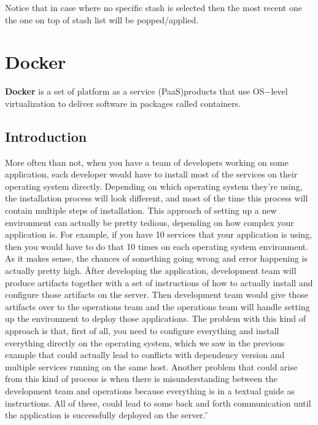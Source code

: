 Notice that in case where no specific stash is selected then the most recent one the one on top of stash list will be
popped/applied.

\newpage

\section{Docker}\label{sec:docker}


\bd[Docker]
\textbf{Docker} is a set of platform as a service (PaaS)\footnotemark products that use OS$-$level virtualization to
deliver software in packages called containers.
\ed


\subsection{Introduction}

More often than not, when you have a team of developers working on some application, each developer would have to
install most of the services on their operating system directly. Depending on which operating system they're using,
the installation process will look different, and most of the time this process will contain multiple steps of
installation. This approach of setting up a new environment can actually be pretty tedious, depending on how complex
your application is. For example, if you have 10 services that your application is using, then you would have to do
that 10 times on each operating system environment. As it makes sense, the chances of something going wrong and error
happening is actually pretty high. \v

After developing the application, development team will produce artifacts together with a set of instructions of how
to actually install and configure those artifacts on the server. Then development team would give those artifacts
over to the operations team and the operations team will handle setting up the environment to deploy those
applications. The problem with this kind of approach is that, first of all, you need to configure everything and
install everything directly on the operating system, which we saw in the previous example that could actually lead to
conflicts with dependency version and multiple services running on the same host. Another problem that could arise
from this kind of process is when there is misunderstanding between the development team and operations because
everything is in a textual guide as instructions. All of these, could lead to some back and forth communication until
the application is successfully deployed on the server. \v

